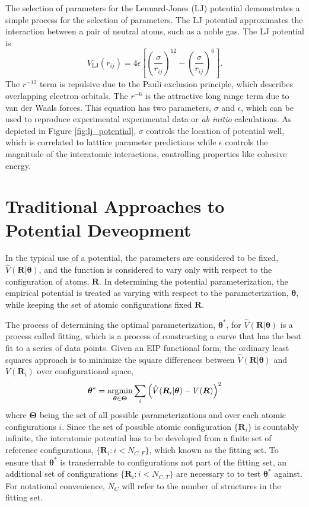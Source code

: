 The selection of parameters for the Lennard-Jones (LJ)\cite{lennardjones1924_lj_pot} potential demonstrates a simple process for the selection of parameters. The LJ potential approximates the interaction between a pair of neutral atoms, such as a noble gas.  The LJ potential is
\begin{equation}
	V_{\text{LJ}}(r_{ij}) = 4 \epsilon
    \left[
	\left(\frac{\sigma}{r_{ij}}\right)^{12}
	- \left(\frac{\sigma}{r_{ij}}\right)^{6}
    \right].
\end{equation}
The $r^{-12}$ term is repulsive due to the Pauli exclusion principle, which describes overlapping electron orbitals.  The $r^{-6}$ is the attractive long range term due to van der Waals forces.  This equation has two parameters, $\sigma$ and $\epsilon$, which can be used to reproduce experimental experimental data or \emph{ab initio} calculations.  As depicted in Figure \ref{fig:lj_potential}, $\sigma$ controls the location of potential well, which is correlated to latttice parameter predictions while $\epsilon$ controls the magnitude of the interatomic interactions, controlling properties like cohesive energy.


\section{Traditional Approaches to Potential Deveopment}

In the typical use of a potential, the parameters are considered to be fixed, $\hat{V}(\bm{R}|\bm{\theta})$, and the function is considered to vary only with respect to the configuration of atoms, $\bm{R}$.  In determining the potential parameterization, the empirical potential is treated as varying with respect to the parameterization, $\bm{\theta}$, while keeping the set of atomic configurations fixed $\bm{R}$.

The process of determining the optimal parameterization, $\bm{\theta}^*$, for $\hat{V}(\bm{R}|\bm{\theta})$ is a process called fitting, which is a process of constructing a curve that has the best fit to a series of data points.  Given an EIP functional form,  the ordinary least squares approach is to minimize the square differences between $\hat{V}(\bm{R}|\bm{\theta})$ and $V(\bm{R}_i)$ over configurational space,
\begin{equation}
\label{eq:energy_matching}
	\bm{\theta}^*
		= \argmin_{\bm{\theta}\in\bm{\Theta}}
					\sum_i \left(\hat{V}(\bm{R}_i|\bm{\theta}) - V(\bm{R})\right)^2
\end{equation}
where $\bm{\Theta}$ being the set of all possible parameterizations and over each atomic configurations $i$.  Since the set of possible atomic configuration $\{\bm{R}_i\}$ is countably infinite, the interatomic potential has to be developed from a finite set of reference configurations, $\{\bm{R}_i:i<N_{C,F}\}$, which known as the fitting set.  To ensure that $\bm{\theta}^*$ is transferrable to configurations not part of the fitting set, an additional set of configurations $\{\bm{R}_i:i<N_{C,T}\}$ are necessary to  to test $\bm{\theta}^*$ against. For notational convenience, $N_C$ will refer to the number of structures in the fitting set.


